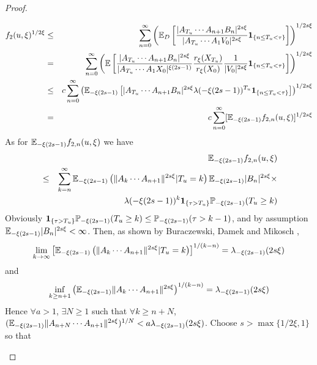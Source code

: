 \documentclass{article}
\begin{document}
\begin{proof}
\begin{enumerate}[(i)]
\begin{itemize}
\begin{eqnarray*}
        f_2(u, \xi)^{1/2\xi} &\leq& \sum_{n=0}^\infty \left(\mathbb{E}_D \left[
            \frac{
              |A_{T_u} \cdots A_{n+1} B_n |^{2s\xi}
            }{
              |A_{T_u} \cdots A_1 V_0|^{2s\xi}
            } \mathbf{1}_{\{n \leq T_u < \tau\}}
          \right]\right)^{1/2s\xi} \\
        &=& \sum_{n=0}^\infty \left(\mathbb{E} \left[
            \frac{
              |A_{T_u} \cdots A_{n+1} B_n |^{2s\xi}
            }{
              |A_{T_u} \cdots A_1 X_0|^{\xi(2s - 1)}
            }
            \frac{
              r_{\xi}(X_{T_u})
            }{
              r_{\xi}(X_{0})
            }
            {1 \over |V_0|^{2s\xi}}\mathbf{1}_{\{n \leq T_u < \tau\}}
          \right]\right)^{1/2s\xi} \\
        &\leq& c \sum_{n=0}^\infty
        \left(\mathbb{E}_{-\xi(2s - 1)} \left[
            |A_{T_u} \cdots A_{n+1} B_n |^{2s\xi}
            \lambda(-\xi(2s - 1))^{T_u}
            \mathbf{1}_{\{n \leq T_u < \tau\}}
          \right]\right)^{1/2s\xi} \\
        &=& c \sum_{n=0}^\infty [\mathbb{E}_{-\xi(2s - 1)}
        f_{2,n}(u,\xi)]^{1/2s\xi}
      \end{eqnarray*}
      As for $\mathbb{E}_{-\xi(2s - 1)} f_{2,n}(u,\xi)$ we have
      \begin{eqnarray*}
        && \mathbb{E}_{-\xi(2s - 1)} f_{2,n}(u,\xi) \\
        &\leq& \sum_{k=n}^\infty \mathbb{E}_{-\xi(2s - 1)}\left(
          \|A_k \cdots A_{n+1}\|^{2s\xi}|T_u = k \right)
        \mathbb{E}_{-\xi(2s - 1)} |B_n|^{2s\xi} \times \\
        && \lambda(-\xi(2s - 1))^{k} \mathbf{1}_{\{\tau > T_u\}}
        \mathbb{P}_{-\xi(2s - 1)}(T_u \geq k)
      \end{eqnarray*}
      Obviously $\mathbf{1}_{\{\tau > T_u\}} \mathbb{P}_{-\xi(2s - 1)}(T_u \geq k) \leq
      \mathbb{P}_{-\xi(2s - 1)}(\tau > k-1)$, and by assumption $\mathbb{E}_{-\xi(2s - 1)}
      |B_n|^{2s\xi} < \infty$. Then, as shown by Buraczewski, Damek
      and Mikosch \cite{BuraczewskiDamekMikosch2015},
      \[
      \lim_{k \to \infty}
      \left[ \mathbb{E}_{-\xi(2s - 1)}\left(
          \|A_k \cdots A_{n+1}\|^{2s\xi}|T_u = k
        \right) \right]^{1/(k-n)} = \lambda_{-\xi(2s - 1)}(2s\xi)
      \]
      and
      \[
      \inf_{k \geq n+1}
      \left(
        \mathbb{E}_{-\xi(2s - 1)}\|A_k \cdots A_{n+1}\|^{2s\xi}
      \right)^{1/(k - n)} = \lambda_{-\xi(2s - 1)}(2s\xi)
      \]
      Hence $\forall a > 1$, $\exists N \geq 1$ such that $\forall k
      \geq n + N$, $(\mathbb{E}_{-\xi(2s - 1)}\|A_{n+N} \cdots
      A_{n+1}\|^{2s\xi})^{1/N} < a \lambda_{-\xi(2s -
        1)}(2s\xi)$. Choose $s > \max\{1/2\xi, 1\}$ so that

\end{itemize}
\end{enumerate}
\end{proof}
\end{document}
